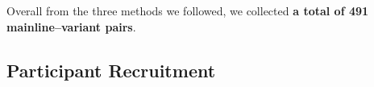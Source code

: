 

Overall from the three methods we followed, we collected \textbf{a total of 491 mainline--variant pairs}.



\subsection{Participant Recruitment}

